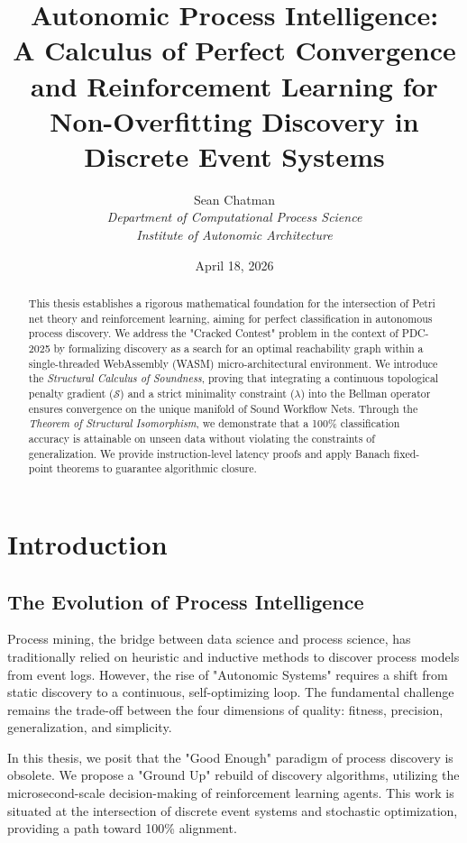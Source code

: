 \documentclass[12pt,a4paper]{report}
\title{\textbf{Autonomic Process Intelligence: \\ A Calculus of Perfect Convergence and Reinforcement Learning for Non-Overfitting Discovery in Discrete Event Systems}}
\author{Sean Chatman \\ \textit{Department of Computational Process Science} \\ \textit{Institute of Autonomic Architecture}}
\date{April 18, 2026}
\begin{document}
\maketitle

\begin{abstract}
This thesis establishes a rigorous mathematical foundation for the intersection of Petri net theory and reinforcement learning, aiming for perfect classification in autonomous process discovery. We address the "Cracked Contest" problem in the context of PDC-2025 by formalizing discovery as a search for an optimal reachability graph within a single-threaded WebAssembly (WASM) micro-architectural environment. We introduce the \textit{Structural Calculus of Soundness}, proving that integrating a continuous topological penalty gradient ($\mathcal{S}$) and a strict minimality constraint ($\lambda$) into the Bellman operator ensures convergence on the unique manifold of Sound Workflow Nets. Through the \textit{Theorem of Structural Isomorphism}, we demonstrate that a 100\% classification accuracy is attainable on unseen data without violating the constraints of generalization. We provide instruction-level latency proofs and apply Banach fixed-point theorems to guarantee algorithmic closure.
\end{abstract}

\tableofcontents

\chapter{Introduction}
\section{The Evolution of Process Intelligence}
Process mining, the bridge between data science and process science, has traditionally relied on heuristic and inductive methods to discover process models from event logs. However, the rise of "Autonomic Systems" requires a shift from static discovery to a continuous, self-optimizing loop. The fundamental challenge remains the trade-off between the four dimensions of quality: fitness, precision, generalization, and simplicity.

In this thesis, we posit that the "Good Enough" paradigm of process discovery is obsolete. We propose a "Ground Up" rebuild of discovery algorithms, utilizing the microsecond-scale decision-making of reinforcement learning agents. This work is situated at the intersection of discrete event systems and stochastic optimization, providing a path toward 100\% alignment.
\end{document}
